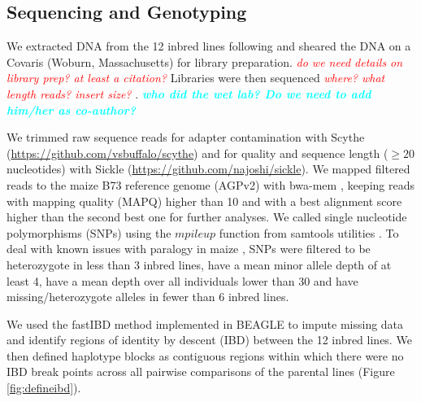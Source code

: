 \documentclass[9pt,twocolumn,twoside]{gsajnl}
\newcommand{\yang}[1]{\textcolor{cyan}{\emph{\bf  #1}} }
\newcommand{\jri}[1]{\textcolor{red}{ \emph{ #1}} }
\begin{document}
\subsection*{Sequencing and Genotyping}

We extracted DNA from the 12 inbred lines following \citet{Doyle1987} and sheared the DNA on a Covaris (Woburn, Massachusetts) for library preparation. \jri{do we need details on library prep? at least a citation?}
Libraries were then sequenced \jri{where? what length reads? insert size?}. \yang{who did the wet lab? Do we need to add him/her as co-author?}

We trimmed  raw sequence reads for adapter contamination with Scythe  (\url{https://github.com/vsbuffalo/scythe}) and for quality and sequence length ($\geq 20$ nucleotides) with Sickle (\url{https://github.com/najoshi/sickle}). 
We mapped filtered reads to the maize B73 reference genome (AGPv2) with bwa-mem \citep{Li2009B}, keeping reads with mapping quality (MAPQ) higher than 10 and with a best alignment score higher than the second best one for further analyses.
We called single nucleotide polymorphisms (SNPs) using the $mpileup$ function from samtools utilities \citep{Li2009}. 
To deal with known issues with paralogy in maize \citep{Chia2012}, SNPs were filtered to be heterozygote in less than 3 inbred lines, have a mean minor allele depth of at least 4, have a mean depth over all individuals lower than 30 and have missing/heterozygote alleles in fewer than 6 inbred lines. 

We used the fastIBD method implemented in BEAGLE \citep{Browning2009} to impute missing data and identify regions of identity by descent (IBD) between the 12 inbred lines. We then defined haplotype blocks as contiguous regions within which there were no IBD break points across all pairwise comparisons of the parental lines (Figure \ref{fig:defineibd}). 


\end{document}
